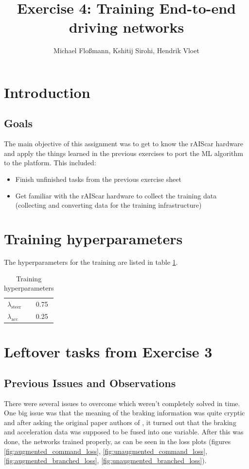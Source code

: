 \documentclass[a4paper]{article}
\title{Exercise 4: Training End-to-end driving networks}
\author{Michael Floßmann, Kshitij Sirohi, Hendrik Vloet}
\begin{document}
\maketitle

\section{Introduction}
\subsection{Goals}
The main objective of this assignment was to get to know the rAIScar hardware
and apply the things learned in the previous exercises to port the ML algorithm
to the platform. This included:
\begin{itemize}
\item Finish unfinished tasks from the previous exercise sheet
\item Get familiar with the rAIScar hardware to collect the training data
  (collecting and converting data for the training infrastructure)
\end{itemize}

\section{Training hyperparameters}

The hyperparameters for the training are listed in table \ref{tab:hyperpars}.

\begin{table}[H]
  \centering
  \caption{Training hyperparameters}
  \label{tab:hyperpars}
  \begin{tabular}{lc}
    $\lambda_{\mathrm{steer}}$ & 0.75 \\
    $\lambda_{\mathrm{acc}}$ & 0.25 \\
  \end{tabular}
\end{table}

\section{Leftover tasks from Exercise 3}
\subsection{Previous Issues and Observations}
There were several issues to overcome which weren't completely solved in time.
One big issue was that the meaning of the braking information was quite cryptic
and after asking the original paper authors of \cite{imitation}, it turned out
that the braking and acceleration data was supposed to be fused into one
variable. After this was done, the networks trained properly, as can be seen in
the loss plots (figures \ref{fig:augmented_command_loss}, \ref{fig:unaugmented_command_loss},
\ref{fig:augmented_branched_loss}, \ref{fig:unaugmented_branched_loss}).
\end{document}
